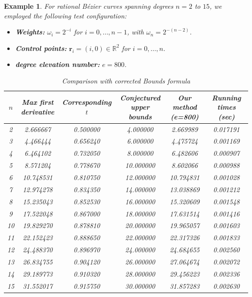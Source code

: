 \documentclass[preprint,12pt]{elsarticle}
\newtheorem{example}{Example}
\begin{document}
\begin{example}
  For rational Bézier curves spanning degrees $n = 2$ to $15$, we employed the following test configuration:

\begin{itemize}
\item \textbf{Weights:} $\omega_i = 2^{-i}$ for $i = 0, \ldots, n-1$, with $\omega_n = 2^{-(n-2)}$.
\item \textbf{Control points:} $\mathbf{r}_i = (i, 0) \in \mathbb{R}^2$ for $i = 0, \ldots, n$.
\item  \textbf{degree elevation number:} $e=800$.
\end{itemize}

\begin{table}[h!]
\caption{Comparison with corrected Bounds formula}
\label{tab:result2}
\centering
\begin{tabular}{c c c c | c c}
\hline
$n$ & \makecell{Max first\\derivative} & \makecell{Corresponding\\ $t$} & \makecell{Conjectured\\upper bounds} & \makecell{Our method\\(e=800)} & \makecell{Running times\\(sec)} \\ 
\hline
2 & 2.666667 & 0.500000 & 4.000000 & 2.669989 & 0.017191 \\ 
3 & 4.466444 & 0.656240 & 6.000000 & 4.475724 & 0.001169 \\ 
4 & 6.464102 & 0.732050 & 8.000000 & 6.482606 & 0.000907 \\ 
5 & 8.571204 & 0.778670 & 10.000000 & 8.602066 & 0.000988 \\ 
6 & 10.748531 & 0.810750 & 12.000000 & 10.794831 & 0.001028 \\ 
7 & 12.974278 & 0.834350 & 14.000000 & 13.038869 & 0.001212 \\ 
8 & 15.235043 & 0.852530 & 16.000000 & 15.320609 & 0.001548 \\ 
9 & 17.522048 & 0.867000 & 18.000000 & 17.631514 & 0.001416 \\ 
10 & 19.829270 & 0.878810 & 20.000000 & 19.965057 & 0.001603 \\ 
11 & 22.152423 & 0.888650 & 22.000000 & 22.317326 & 0.001833 \\ 
12 & 24.488370 & 0.896970 & 24.000000 & 24.684655 & 0.002560 \\ 
13 & 26.834755 & 0.904120 & 26.000000 & 27.064674 & 0.002072 \\ 
14 & 29.189773 & 0.910320 & 28.000000 & 29.456223 & 0.002336 \\ 
15 & 31.552017 & 0.915750 & 30.000000 & 31.857283 & 0.002630 \\ 
\hline
\end{tabular}


\end{table}
\end{example}
\end{document}
